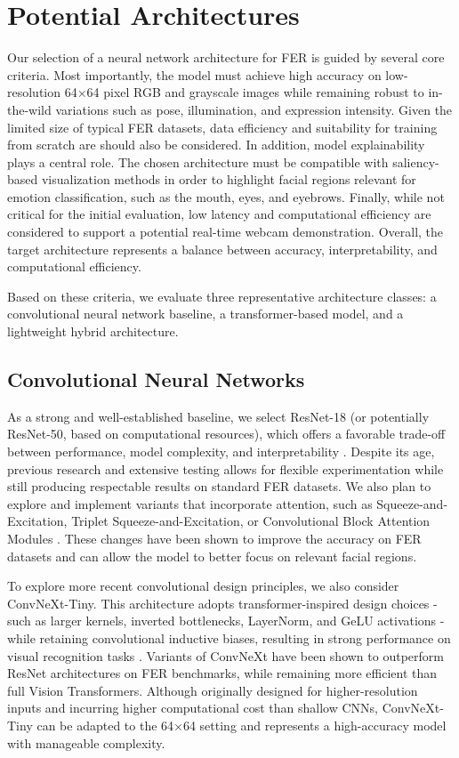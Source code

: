 \section {Potential Architectures} 
\label {sec:approaches}
Our selection of a neural network architecture for FER is guided by several core criteria. Most importantly, the model must achieve high accuracy on low-resolution 64×64 pixel RGB and grayscale images while remaining robust to in-the-wild variations such as pose, illumination, and expression intensity. Given the limited size of typical FER datasets, data efficiency and suitability for training from scratch are should also be considered. 
In addition, model explainability plays a central role. The chosen architecture must be compatible with saliency-based visualization methods in order to highlight facial regions relevant for emotion classification, such as the mouth, eyes, and eyebrows. Finally, while not critical for the initial evaluation, low latency and computational efficiency are considered to support a potential real-time webcam demonstration. Overall, the target architecture represents a balance between accuracy, interpretability, and computational efficiency.

Based on these criteria, we evaluate three representative architecture classes: a convolutional neural network baseline, a transformer-based model, and a lightweight hybrid architecture. 

\subsection{Convolutional Neural Networks}
As a strong and well-established baseline, we select ResNet-18 (or potentially ResNet-50, based on computational resources), which offers a favorable trade-off between performance, model complexity, and interpretability \cite{deepres}. Despite its age, previous research and extensive testing allows for flexible experimentation while still producing respectable results on standard FER datasets. We also plan to explore and implement variants that incorporate attention, such as Squeeze-and-Excitation, Triplet Squeeze-and-Excitation, or Convolutional Block Attention Modules \cite{hu2019squeezeandexcitationnetworks,alhazmi2025achieving3dattentiontriplet,woo2018cbamconvolutionalblockattention}. These changes have been shown to improve the accuracy on FER datasets and can allow the model to better focus on relevant facial regions.

To explore more recent convolutional design principles, we also consider ConvNeXt-Tiny. This architecture adopts transformer-inspired design choices - such as larger kernels, inverted bottlenecks, LayerNorm, and GeLU activations - while retaining convolutional inductive biases, resulting in strong performance on visual recognition tasks \cite{liu2022convnet2020s}. Variants of ConvNeXt have been shown to outperform ResNet architectures on FER benchmarks, while remaining more efficient than full Vision Transformers. Although originally designed for higher-resolution inputs and incurring higher computational cost than shallow CNNs, ConvNeXt-Tiny can be adapted to the 64×64 setting and represents a high-accuracy model with manageable complexity.

